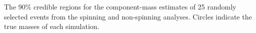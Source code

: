 \label{fig:comp_masses} The 90\% credible regions for the component-mass estimates of 25 randomly selected events from the spinning and non-spinning analyses.  Circles indicate the true masses of each simulation.